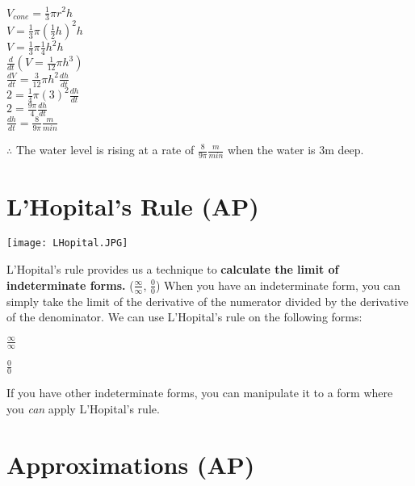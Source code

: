 \documentclass[12pt,fleqn]{book} %
\begin{document}
\begin{center}
    $V_{cone}=\frac{1}{3} \pi r^2 h$ \\
    \vspace*{2mm}
    $V=\frac{1}{3} \pi (\frac{1}{2}h)^2 h$ \\
    \vspace*{2mm}
    $V=\frac{1}{3} \pi \frac{1}{4}h^2h$\\
    \vspace*{2mm}
    $\frac{d}{dt}(V=\frac{1}{12} \pi h^3)$ \\
    \vspace*{2mm}
    $\frac{dV}{dt}=\frac{3}{12} \pi h^2 \frac{dh}{dt}$ \\
    \vspace*{2mm}
    $2=\frac{1}{4} \pi (3)^2 \frac{dh}{dt}$ \\
    \vspace*{2mm}
    $2=\frac{9 \pi}{4} \frac{dh}{dt}$ \\
    \vspace*{2mm}
    $\frac{dh}{dt}=\frac{8}{9 \pi} \frac{m}{min}$
\end{center}

\noindent $\therefore$ The water level is rising at a rate of $\frac{8}{9 \pi} \frac{m}{min}$ when the water is 3m deep.

\section{L'Hopital's Rule (AP)}

\texttt{[image: LHopital.JPG]}

\noindent L'Hopital's rule provides us a technique to \textbf{calculate the limit of indeterminate forms.} ($\frac{\infty}{\infty}$, $\frac{0}{0}$) When you have an indeterminate form, you can simply take the limit
of the derivative of the numerator divided by the derivative of the denominator. We can use L'Hopital's rule on the following forms:

\begin{multicols}{2}
    \begin{center}
        {\large$\frac{\infty}{\infty}$

            $\frac{0}{0}$}
    \end{center}
\end{multicols}

\noindent If you have other indeterminate forms, you can manipulate it to a form where you \emph{can} apply L'Hopital's rule.



\section{Approximations (AP)}
\end{document}
